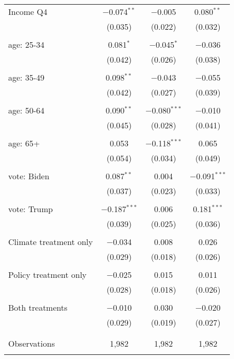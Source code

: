 \begin{tabular}{@{\extracolsep{5pt}}lccc}
 Income Q4 & $-$0.074$^{**}$ & $-$0.005 & 0.080$^{**}$ \\ 
  & (0.035) & (0.022) & (0.032) \\ 
  & & & \\ 
 age: 25-34 & 0.081$^{*}$ & $-$0.045$^{*}$ & $-$0.036 \\ 
  & (0.042) & (0.026) & (0.038) \\ 
  & & & \\ 
 age: 35-49 & 0.098$^{**}$ & $-$0.043 & $-$0.055 \\ 
  & (0.042) & (0.027) & (0.039) \\ 
  & & & \\ 
 age: 50-64 & 0.090$^{**}$ & $-$0.080$^{***}$ & $-$0.010 \\ 
  & (0.045) & (0.028) & (0.041) \\ 
  & & & \\ 
 age: 65+ & 0.053 & $-$0.118$^{***}$ & 0.065 \\ 
  & (0.054) & (0.034) & (0.049) \\ 
  & & & \\ 
 vote: Biden & 0.087$^{**}$ & 0.004 & $-$0.091$^{***}$ \\ 
  & (0.037) & (0.023) & (0.033) \\ 
  & & & \\ 
 vote: Trump & $-$0.187$^{***}$ & 0.006 & 0.181$^{***}$ \\ 
  & (0.039) & (0.025) & (0.036) \\ 
  & & & \\ 
 Climate treatment only & $-$0.034 & 0.008 & 0.026 \\ 
  & (0.029) & (0.018) & (0.026) \\ 
  & & & \\ 
 Policy treatment only & $-$0.025 & 0.015 & 0.011 \\ 
  & (0.028) & (0.018) & (0.026) \\ 
  & & & \\ 
 Both treatments & $-$0.010 & 0.030 & $-$0.020 \\ 
  & (0.029) & (0.019) & (0.027) \\ 
  & & & \\ 
\hline \\[-1.8ex] 

Observations & 1,982 & 1,982 & 1,982 \\ 
\hline 
\hline \\[-1.8ex] 
\end{tabular} 